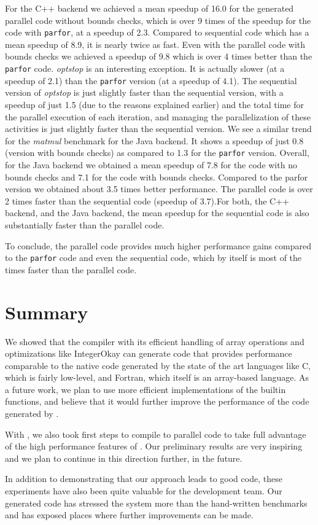 For the \xten C++ backend we achieved a mean speedup of 16.0 for the
generated parallel \xten code without bounds checks, which is over 9
times of the speedup for the \matlab code with \texttt{parfor}, at a
speedup of 2.3. Compared to \xten sequential code which has a mean
speedup of 8.9, it is nearly twice as fast.  Even with the parallel
\xten code with bounds checks we achieved a speedup of 9.8 which is over 4
times better than the \matlab \texttt{parfor} code.  \emph{optstop} is
an interesting exception. It is actually slower (at a speedup of 2.1)
than the \matlab \texttt{parfor} version (at a speedup of 4.1). The
sequential version of \emph{optstop} is just slightly faster than the
sequential \matlab version, with a speedup of just 1.5 (due to the
reasons explained earlier) and the total time for the parallel execution
of each iteration, and managing the parallelization of these activities
is just slightly faster than the sequential version. We see a similar
trend for the \emph{matmul} benchmark for the \xten Java backend. It
shows a speedup of just 0.8 (version with bounds checks) as compared to
1.3 for the \matlab \texttt{parfor} version. Overall, for the Java
backend we obtained a mean speedup of 7.8 for the \xten code with no
bounds checks and 7.1 for the code with bounds checks. Compared to the
\matlab parfor version we obtained about 3.5 times better performance. The
parallel \xten code is over 2 times faster than the sequential \xten
code (speedup of 3.7).For both, the C++ backend, and the Java backend,
the mean speedup for the sequential \xten code is also substantially
faster than the \matlab parallel code.  

To conclude, the parallel \xten code provides much higher performance
gains compared to the \matlab \texttt{parfor} code  and even the \xten
sequential code, which by itself is most of the times faster than the
\matlab parallel code.


\section{Summary}

We showed that the \mixten compiler with its efficient handling of array
operations and optimizations like IntegerOkay can generate \xten code
that provides performance comparable to the native code generated by the
state of the art languages like C, which is fairly low-level, and
Fortran, which itself is an array-based language.  As a future work, we
plan to use more efficient implementations of the builtin functions, and
believe that it would further improve the performance of the code
generated by \mixten.

With \mixten, we also took first steps to compile \matlab to parallel
\xten code to take full advantage of the high performance features of
\xten. Our preliminary results are very inspiring and we plan to
continue in this direction further, in the future.

In addition to demonstrating that our approach leads to good code, these
experiments have also been quite valuable for the \xten development team.
Our generated code has stressed the \xten system more than the
hand-written \xten benchmarks and has exposed places where further
improvements can be made.
